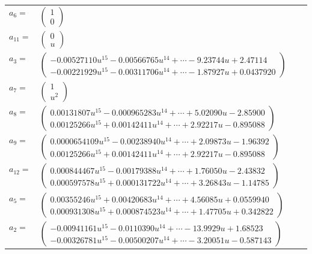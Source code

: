 \documentclass[1p]{elsarticle_modified}
\theoremstyle{definition}
\begin{document}
\begin{tabular}{m{7pt} m{180pt} m{7pt} m{180pt} }
\flushright $a_{6}=$&$\begin{pmatrix}1\\0\end{pmatrix}$ \\
\flushright $a_{11}=$&$\begin{pmatrix}0\\u\end{pmatrix}$ \\
\flushright $a_{3}=$&$\begin{pmatrix}-0.00527110 u^{15}-0.00566765 u^{14}+\cdots-9.23744 u+2.47114\\-0.00221929 u^{15}-0.00311706 u^{14}+\cdots-1.87927 u+0.0437920\end{pmatrix}$ \\
\flushright $a_{7}=$&$\begin{pmatrix}1\\u^2\end{pmatrix}$ \\
\flushright $a_{8}=$&$\begin{pmatrix}0.00131807 u^{15}-0.000965283 u^{14}+\cdots+5.02090 u-2.85900\\0.00125266 u^{15}+0.00142411 u^{14}+\cdots+2.92217 u-0.895088\end{pmatrix}$ \\
\flushright $a_{9}=$&$\begin{pmatrix}0.0000654109 u^{15}-0.00238940 u^{14}+\cdots+2.09873 u-1.96392\\0.00125266 u^{15}+0.00142411 u^{14}+\cdots+2.92217 u-0.895088\end{pmatrix}$ \\
\flushright $a_{12}=$&$\begin{pmatrix}0.000844467 u^{15}-0.00179388 u^{14}+\cdots+1.76050 u-2.43832\\0.000597578 u^{15}+0.000131722 u^{14}+\cdots+3.26843 u-1.14785\end{pmatrix}$ \\
\flushright $a_{5}=$&$\begin{pmatrix}0.00355246 u^{15}+0.00420683 u^{14}+\cdots+4.56085 u+0.0559940\\0.000931308 u^{15}+0.000874523 u^{14}+\cdots+1.47705 u+0.342822\end{pmatrix}$ \\
\flushright $a_{2}=$&$\begin{pmatrix}-0.00941161 u^{15}-0.0110390 u^{14}+\cdots-13.9929 u+1.68523\\-0.00326781 u^{15}-0.00500207 u^{14}+\cdots-3.20051 u-0.587143\end{pmatrix}$ \\

\end{tabular}
\end{document}
